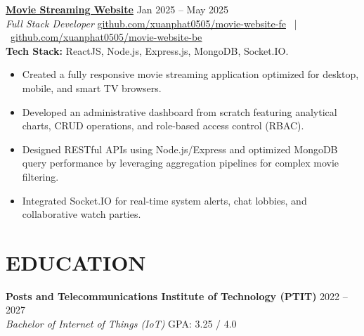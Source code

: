 \documentclass[10pt,a4paper]{article}
\begin{document}
\textbf{\href{http://movie-web-0505.netlify.app}{Movie Streaming Website}} \hfill Jan 2025 -- May 2025 \\
\textit{Full Stack Developer} \hfill \href{https://github.com/xuanphat0505/movie-website-fe}{\underline{github.com/xuanphat0505/movie-website-fe}} \ | \ \href{https://github.com/xuanphat0505/movie-website-be}{\underline{github.com/xuanphat0505/movie-website-be}} \\
\textbf{Tech Stack:} ReactJS, Node.js, Express.js, MongoDB, Socket.IO.
\begin{itemize}
    \item Created a fully responsive movie streaming application optimized for desktop, mobile, and smart TV browsers.
    \item Developed an administrative dashboard from scratch featuring analytical charts, CRUD operations, and role-based access control (RBAC).
    \item Designed RESTful APIs using Node.js/Express and optimized MongoDB query performance by leveraging aggregation pipelines for complex movie filtering.
    \item Integrated Socket.IO for real-time system alerts, chat lobbies, and collaborative watch parties.
\end{itemize}

\vspace{1pt}

\section*{EDUCATION}
\textbf{Posts and Telecommunications Institute of Technology (PTIT)} \hfill 2022 -- 2027 \\
\textit{Bachelor of Internet of Things (IoT)} \hfill GPA: 3.25 / 4.0
\end{document}
